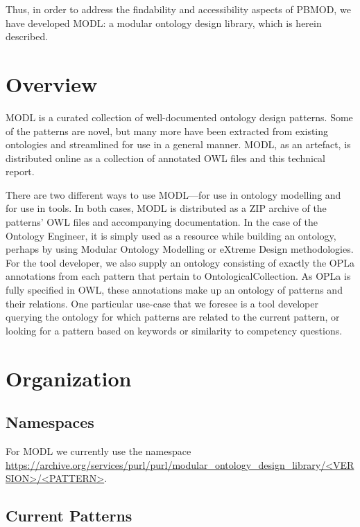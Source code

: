 Thus, in order to address the findability and accessibility aspects of PBMOD, we have developed MODL: a modular ontology design library, which is herein described.

\section*{Overview}
MODL is a curated collection of well-documented ontology design patterns. Some of the patterns are novel, but many more have been extracted from existing ontologies and streamlined for use in a general manner. MODL, as an artefact, is distributed online as a collection of annotated OWL files and this technical report.

There are two different ways to use MODL---for use in ontology modelling and for use in tools. In both cases, MODL is distributed as a ZIP archive of the patterns' OWL files and accompanying documentation. In the case of the Ontology Engineer, it is simply used as a resource while building an ontology, perhaps by using Modular Ontology Modelling or eXtreme Design methodologies. For the tool developer, we also supply an ontology consisting of exactly the OPLa annotations from each pattern that pertain to \textsf{OntologicalCollection}. As OPLa is fully specified in OWL, these annotations make up an ontology of patterns and their relations. One particular use-case that we foresee is a tool developer querying the ontology for which patterns are related to the current pattern, or looking for a pattern based on keywords or similarity to competency questions.

\section*{Organization}
\subsection*{Namespaces}
For MODL we currently use the namespace \url{https://archive.org/services/purl/purl/modular_ontology_design_library/<VERSION>/<PATTERN>}. 

\subsection*{Current Patterns}

